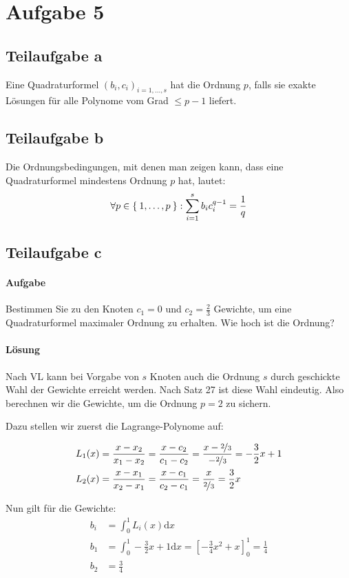\section*{Aufgabe 5}
\subsection*{Teilaufgabe a}
Eine Quadraturformel $(b_i, c_i)_{i=1, \dots, s}$ hat die Ordnung
$p$, falls sie exakte Lösungen für alle Polynome vom Grad $\leq p -1$
liefert.

\subsection*{Teilaufgabe b}
Die Ordnungsbedingungen, mit denen man zeigen kann, dass eine Quadraturformel
mindestens Ordnung $p$ hat, lautet:
\[\forall p \in \Set{1, \dots, p}: \sum_{i=1}^s b_i c_i^{q-1} = \frac{1}{q}\]

\subsection*{Teilaufgabe c}
\paragraph{Aufgabe} Bestimmen Sie zu den Knoten $c_1 = 0$ und $c_2 = \frac{2}{3}$ Gewichte, um eine Quadraturformel
maximaler Ordnung zu erhalten. Wie hoch ist die Ordnung?

\paragraph{Lösung}

Nach VL kann bei Vorgabe von $s$ Knoten auch die Ordnung $s$ durch 
geschickte Wahl der Gewichte erreicht werden. Nach Satz 27 ist diese
Wahl eindeutig.
Also berechnen wir die Gewichte, um die Ordnung $p=2$ zu sichern.

Dazu stellen wir zuerst die Lagrange-Polynome auf:

\begin{align}
	L_1(x) &= \frac{x-x_2}{x_1 - x_2} = \frac{x-c_2}{c_1-c_2} = \frac{x-\nicefrac{2}{3}}{-\nicefrac{2}{3}} = -\frac{3}{2} x + 1\\
    L_2(x) &= \frac{x-x_1}{x_2 - x_1} = \frac{x-c_1}{c_2-c_1} = \frac{x}{\nicefrac{2}{3}} = \frac{3}{2} x
\end{align}

Nun gilt für die Gewichte:
\begin{align}
	b_i &= \int_0^1 L_i(x) \mathrm{d}x\\
	b_1 &= \int_0^1 -\frac{3}{2} x + 1 \mathrm{d}x = \left [ -\frac{3}{4}x^2 + x \right ]_0^1 = \frac{1}{4}\\
	b_2 &= \frac{3}{4}
\end{align}

